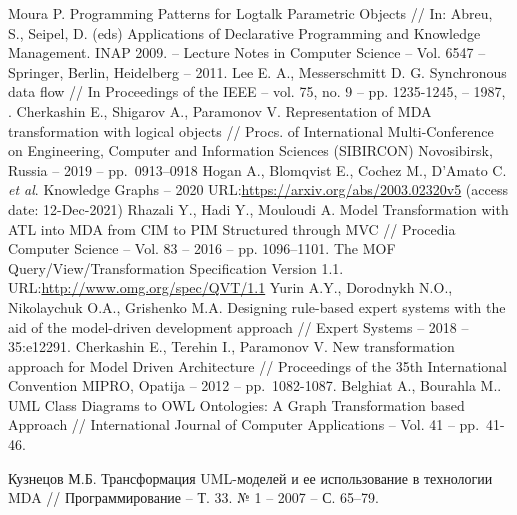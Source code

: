 \documentclass[
]{ceurart}
\begin{document}
\begin{thebibliography}{99}
Moura P. Programming Patterns for Logtalk Parametric Objects // In: Abreu, S., Seipel, D. (eds) Applications of Declarative Programming and Knowledge Management. INAP 2009. -- Lecture Notes in Computer Science -- Vol. 6547 -- Springer, Berlin, Heidelberg -- 2011. 
Lee E. A., Messerschmitt D. G. Synchronous data flow // In Proceedings of the IEEE -- vol. 75, no. 9 -- pp. 1235-1245, -- 1987, .
 Cherkashin E., Shigarov A., Paramonov V. Representation of MDA transformation with logical objects // Procs. of International Multi-Conference on Engineering, Computer and Information Sciences (SIBIRCON) Novosibirsk, Russia -- 2019 -- pp.~0913--0918 
 Hogan A., Blomqvist E., Cochez M., D’Amato C. \emph{et al}. Knowledge Graphs -- 2020 URL:\url{https://arxiv.org/abs/2003.02320v5} (access date: 12-Dec-2021)
Rhazali Y., Hadi Y., Mouloudi A. Model Transformation with ATL into MDA from CIM to PIM Structured through MVC // Procedia Computer Science -- Vol. 83 -- 2016 -- pp. 1096–1101. 
 The MOF Query/View/Transformation Specification Version 1.1. URL:\url{http://www.omg.org/spec/QVT/1.1}
 Yurin A.Y., Dorodnykh N.O., Nikolaychuk O.A., Grishenko M.A. Designing rule-based expert systems with the aid of the model-driven development approach // Expert Systems -- 2018 -- 35:e12291. 
 Cherkashin E., Terehin I., Paramonov V. New transformation approach for Model Driven Architecture // Proceedings of the 35th International Convention MIPRO, Opatija -- 2012 -- pp.~1082-1087.
 Belghiat A., Bourahla M.. UML Class Diagrams to OWL Ontologies: A Graph Transformation based Approach // International Journal of Computer Applications -- Vol. 41 -- pp.~41-46.

Кузнецов М.Б. Трансформация UML-моделей и ее использование в технологии MDA // Программирование -- Т. 33. № 1 -- 2007 -- С. 65--79.


\end{thebibliography}
\end{document}
